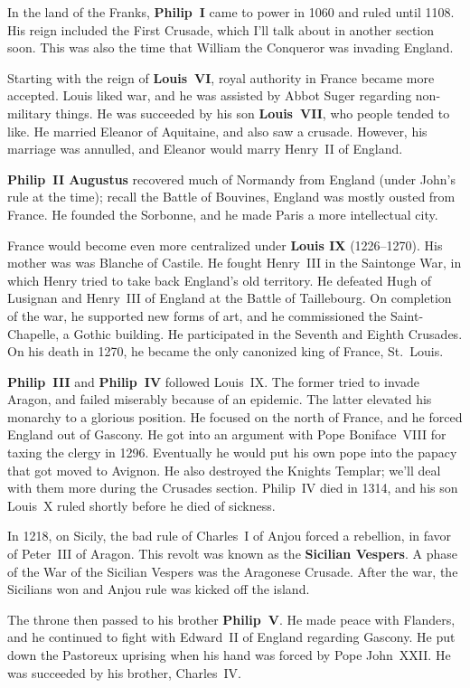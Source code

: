 In the land of the Franks, \textbf{Philip~I} came to power in 1060 and ruled until 1108.
His reign included the First Crusade, which I'll talk about in another section soon.
This was also the time that William the Conqueror was invading England.

Starting with the reign of \textbf{Louis~VI}, royal authority in France became more accepted.
Louis liked war, and he was assisted by Abbot Suger regarding non-military things.
He was succeeded by his son \textbf{Louis~VII}, who people tended to like.
He married Eleanor of Aquitaine, and also saw a crusade.
However, his marriage was annulled, and Eleanor would marry Henry~II of England.

\textbf{Philip~II Augustus} recovered much of Normandy from England (under John's rule at the time);
recall the Battle of Bouvines, England was mostly ousted from France.
He founded the Sorbonne, and he made Paris a more intellectual city.

France would become even more centralized under \textbf{Louis IX} (1226--1270).
His mother was was Blanche of Castile.
He fought Henry~III in the Saintonge War, in which Henry tried to take back England's old territory.
He defeated Hugh of Lusignan and Henry~III of England at the Battle of Taillebourg.
On completion of the war, he supported new forms of art, and he commissioned the Saint-Chapelle, a Gothic building.
He participated in the Seventh and Eighth Crusades.
On his death in 1270, he became the only canonized king of France, St.\ Louis.

\textbf{Philip~III} and \textbf{Philip~IV} followed Louis~IX\@.
The former tried to invade Aragon, and failed miserably because of an epidemic.
The latter elevated his monarchy to a glorious position.
He focused on the north of France, and he forced England out of Gascony.
He got into an argument with Pope Boniface~VIII for taxing the clergy in 1296.
Eventually he would put his own pope into the papacy that got moved to Avignon.
He also destroyed the Knights Templar; we'll deal with them more during the Crusades section.
Philip~IV died in 1314, and his son Louis~X ruled shortly before he died of sickness.

In 1218, on Sicily, the bad rule of Charles~I of Anjou forced a rebellion, in favor of Peter~III of Aragon.
This revolt was known as the \textbf{Sicilian Vespers}.
A phase of the War of the Sicilian Vespers was the Aragonese Crusade.
After the war, the Sicilians won and Anjou rule was kicked off the island.

The throne then passed to his brother \textbf{Philip~V}.
He made peace with Flanders, and he continued to fight with Edward~II of England regarding Gascony.
He put down the Pastoreux uprising when his hand was forced by Pope John~XXII\@.
He was succeeded by his brother, Charles~IV\@.

